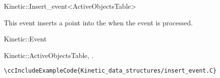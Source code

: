 

\begin{ccRefClass}{Kinetic::Insert_event<ActiveObjectsTable>}  %


\ccDefinition
  
This event inserts a point into the  when the event is processed.


\ccIsModel
Kinetic::Event

\ccCreation
{}  %



\ccSeeAlso

Kinetic::ActiveObjectsTable,
.

\ccExample


\verb|\ccIncludeExampleCode{Kinetic_data_structures/insert_event.C}| 




\end{ccRefClass}


